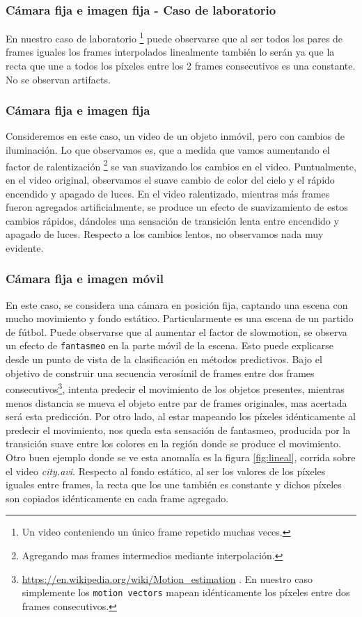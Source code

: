 \subsubsection{Cámara fija e imagen fija - Caso de laboratorio}
En nuestro caso de laboratorio \footnote{Un video conteniendo un único frame repetido muchas veces.} puede observarse que al ser todos los pares de frames iguales los frames interpolados linealmente también lo serán ya que la recta que une a todos los píxeles entre los 2 frames consecutivos es una constante. No se observan artifacts.

\subsubsection{Cámara fija e imagen fija}
Consideremos en este caso, un video de un objeto inmóvil, pero con cambios de iluminación. Lo que observamos es, que a medida que vamos aumentando el factor de ralentización \footnote{Agregando mas frames intermedios mediante interpolación.} se van suavizando los cambios en el video. Puntualmente, en el video original, observamos el suave cambio de color del cielo y el rápido encendido y apagado de luces. En el video ralentizado, mientras más frames fueron agregados artificialmente, se produce un efecto de suavizamiento de estos cambios rápidos, dándoles una sensación de transición lenta entre encendido y apagado de luces. Respecto a los cambios lentos, no observamos nada muy evidente.

\subsubsection{Cámara fija e imagen móvil}
En este caso, se considera una cámara en posición fija, captando una escena con mucho movimiento y fondo estático. Particularmente es una escena de un partido de fútbol. Puede observarse que al aumentar el factor de slowmotion, se observa un efecto de \texttt{fantasmeo} en la parte móvil de la escena. Esto puede explicarse desde un punto de vista de la clasificación en métodos predictivos. Bajo el objetivo de construir una secuencia verosímil de frames entre dos frames consecutivos\footnote{\url{https://en.wikipedia.org/wiki/Motion_estimation} . En nuestro caso simplemente los \texttt{motion vectors} mapean idénticamente los píxeles entre dos frames consecutivos.}, intenta predecir el movimiento de los objetos presentes, mientras menos distancia se mueva el objeto entre par de frames originales, mas acertada será esta predicción. Por otro lado, al estar mapeando los píxeles idénticamente al predecir el movimiento, nos queda esta sensación de fantasmeo, producida por la transición suave entre los colores en la región donde se produce el movimiento. Otro buen ejemplo donde se ve esta anomalía es la figura \ref{fig:lineal}, corrida sobre el video \emph{city.avi}. Respecto al fondo estático, al ser los valores de los píxeles iguales entre frames, la recta que los une también es constante y dichos píxeles son copiados idénticamente en cada frame agregado.

